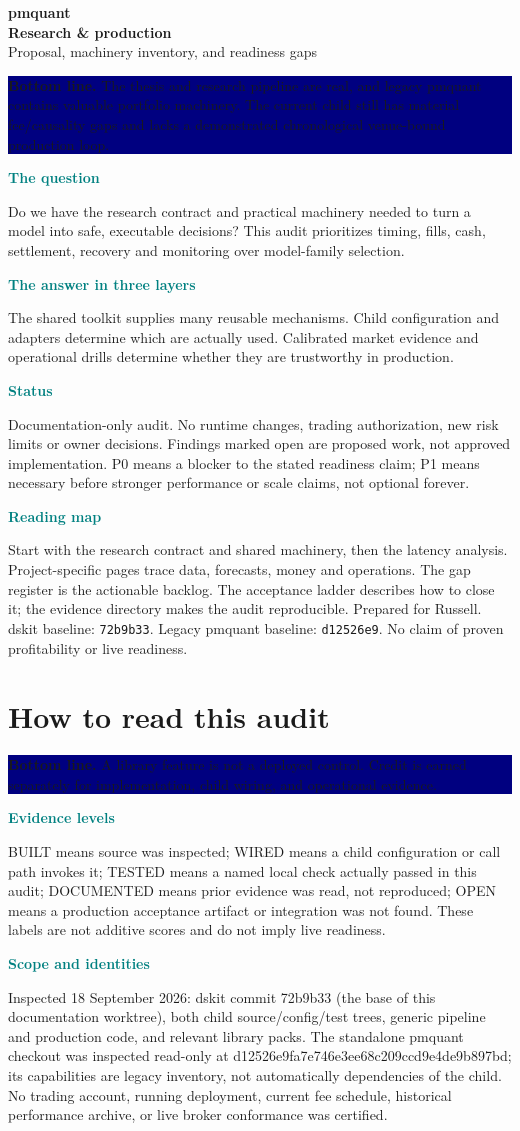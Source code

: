 \documentclass[10pt,letterpaper]{article}
\newcommand{\bl}[1]{\noindent\colorbox{navy}{\parbox{\dimexpr\linewidth-2\fboxsep}{\color{white}\textbf{Bottom line.} #1}}\par\medskip}
\newcommand{\topic}[2]{\clearpage\section{#1}\bl{#2}}
\newcommand{\sub}[1]{\par\textbf{\textcolor{teal}{#1}}\par}
\begin{document}
\thispagestyle{empty}
{\Huge\bfseries\color{navy}pmquant\\[8pt] Research \& production}\\[12pt]
{\Large Proposal, machinery inventory, and readiness gaps}\par\bigskip
\bl{The thesis and research pipeline are real, and legacy pmquant contains valuable portfolio machinery. The current child still has material fee/causality gaps and lacks a demonstrated chronological venue-bound production loop.}
\sub{The question}
Do we have the research contract and practical machinery needed to turn a model into safe, executable decisions? This audit prioritizes timing, fills, cash, settlement, recovery and monitoring over model-family selection.
\sub{The answer in three layers}
The shared toolkit supplies many reusable mechanisms. Child configuration and adapters determine which are actually used. Calibrated market evidence and operational drills determine whether they are trustworthy in production.
\sub{Status}
Documentation-only audit. No runtime changes, trading authorization, new risk limits or owner decisions. Findings marked open are proposed work, not approved implementation. P0 means a blocker to the stated readiness claim; P1 means necessary before stronger performance or scale claims, not optional forever.
\sub{Reading map}
Start with the research contract and shared machinery, then the latency analysis. Project-specific pages trace data, forecasts, money and operations. The gap register is the actionable backlog. The acceptance ladder describes how to close it; the evidence directory makes the audit reproducible.
\vfill
{\small Prepared for Russell. dskit baseline: \texttt{72b9b33}. Legacy pmquant baseline: \texttt{d12526e9}. No claim of proven profitability or live readiness.}
\clearpage
{\small\tableofcontents}
\topic{How to read this audit}{A library feature is not a deployed control. Credit is earned separately for implementation, child wiring, and operational evidence.}
\sub{Evidence levels}
BUILT means source was inspected; WIRED means a child configuration or call path invokes it; TESTED means a named local check actually passed in this audit; DOCUMENTED means prior evidence was read, not reproduced; OPEN means a production acceptance artifact or integration was not found. These labels are not additive scores and do not imply live readiness.
\sub{Scope and identities}
Inspected 18 September 2026: dskit commit 72b9b33 (the base of this documentation worktree), both child source/config/test trees, generic pipeline and production code, and relevant library packs. The standalone pmquant checkout was inspected read-only at d12526e9fa7e746e3ee68c209ccd9e4de9b897bd; its capabilities are legacy inventory, not automatically dependencies of the child. No trading account, running deployment, current fee schedule, historical performance archive, or live broker conformance was certified.
\end{document}
